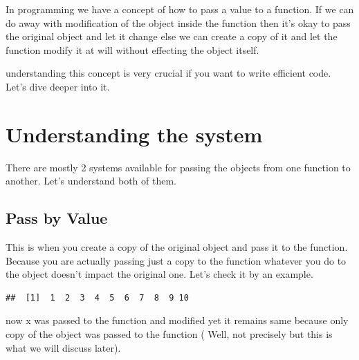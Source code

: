 \documentclass[
]{book}
\newenvironment{Shaded}{\begin{snugshade}}{\end{snugshade}}
\newcommand{\AttributeTok}[1]{\textcolor[rgb]{0.77,0.63,0.00}{#1}}
\newcommand{\ControlFlowTok}[1]{\textcolor[rgb]{0.13,0.29,0.53}{\textbf{#1}}}
\newcommand{\DecValTok}[1]{\textcolor[rgb]{0.00,0.00,0.81}{#1}}
\newcommand{\FunctionTok}[1]{\textcolor[rgb]{0.00,0.00,0.00}{#1}}
\newcommand{\NormalTok}[1]{#1}
\newcommand{\OtherTok}[1]{\textcolor[rgb]{0.56,0.35,0.01}{#1}}
\newcommand{\SpecialCharTok}[1]{\textcolor[rgb]{0.00,0.00,0.00}{#1}}
\begin{document}
In programming we have a concept of how to pass a value to a function. If we can do away with modification of the object inside the function then it's okay to pass the original object and let it change else we can create a copy of it and let the function modify it at will without effecting the object itself.

understanding this concept is very crucial if you want to write efficient code. Let's dive deeper into it.

\hypertarget{understanding-the-system}{%
\section{Understanding the system}\label{understanding-the-system}}

There are mostly 2 systems available for passing the objects from one function to another. Let's understand both of them.

\hypertarget{pass-by-value}{%
\subsection{Pass by Value}\label{pass-by-value}}

This is when you create a copy of the original object and pass it to the function. Because you are actually passing just a copy to the function whatever you do to the object doesn't impact the original one. Let's check it by an example.

\begin{Shaded}
\end{Shaded}

\begin{verbatim}
##  [1]  1  2  3  4  5  6  7  8  9 10
\end{verbatim}

now x was passed to the function and modified yet it remains same because only copy of the object was passed to the function ( Well, not precisely but this is what we will discuss later).
\end{document}
